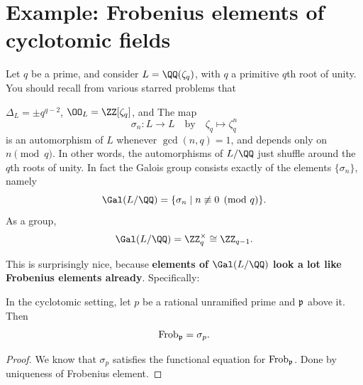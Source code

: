 \section{Example: Frobenius elements of cyclotomic fields}
Let $q$ be a prime, and consider $L = \QQ(\zeta_q)$, with $q$ a primitive $q$th root of unity.
You should recall from various starred problems that
\begin{itemize}
	\ii $\Delta_L = \pm q^{q-2}$,
	\ii $\OO_L = \ZZ[\zeta_q]$, and
	\ii The map \[ \sigma_n : L \to L \quad\text{by}\quad \zeta_q \mapsto \zeta_q^n \]
	is an automorphism of $L$ whenever $\gcd(n,q)=1$,
	and depends only on $n \pmod q$.
	In other words, the automorphisms of $L/\QQ$ just shuffle around the $q$th roots of unity.
	In fact the Galois group consists exactly of the elements $\{\sigma_n\}$, namely
	\[ \Gal(L/\QQ) = \{ \sigma_n \mid n \not\equiv 0 \pmod q \}. \]
	As a group, \[ \Gal(L/\QQ) = \Zm q \cong \Zc{q-1}. \]
\end{itemize}
This is surprisingly nice,
because \textbf{elements of $\Gal(L/\QQ)$ look a lot
like Frobenius elements already}.
Specifically:

\begin{lemma}
	\label{lem:cyclo_frob}
	In the cyclotomic setting, let $p$ be a rational unramified prime
	and $\mathfrak p$ above it. Then \[ \mathrm{Frob}_\mathfrak p = \sigma_p. \]
\end{lemma}
\begin{proof}
	We know that $\sigma_p$ satisfies the functional equation for $\mathrm{Frob}_\mathfrak p$.
	Done by uniqueness of Frobenius element.
%	
\end{proof}

